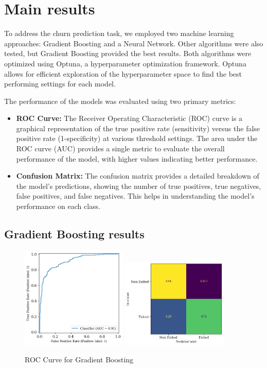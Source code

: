 \documentclass[12pt]{article}
\begin{document}
\section{Main results}
To address the churn prediction task, we employed two machine learning approaches: Gradient Boosting and a Neural Network. Other algorithms were also tested, but Gradient Boosting provided the best results. Both algorithms were optimized using Optuna, a hyperparameter optimization framework. Optuna allows for efficient exploration of the hyperparameter space to find the best performing settings for each model.

The performance of the models was evaluated using two primary metrics:
\begin{itemize}
    \item \textbf{ROC Curve:} The Receiver Operating Characteristic (ROC) curve is a graphical representation of the true positive rate (sensitivity) versus the false positive rate (1-specificity) at various threshold settings. The area under the ROC curve (AUC) provides a single metric to evaluate the overall performance of the model, with higher values indicating better performance.
    \item \textbf{Confusion Matrix:} The confusion matrix provides a detailed breakdown of the model's predictions, showing the number of true positives, true negatives, false positives, and false negatives. This helps in understanding the model's performance on each class.
\end{itemize}

\subsection{Gradient Boosting results}

\begin{figure}[h!]
    \centering
    \includegraphics[width=0.45\textwidth]{figures/roc_curve_gb.png}
    \includegraphics[width=0.45\textwidth]{figures/confusion_matrix_gb.png}
    \caption{ROC Curve for Gradient Boosting}
    \label{fig:roc_curve_gb}
\end{figure}
\end{document}

